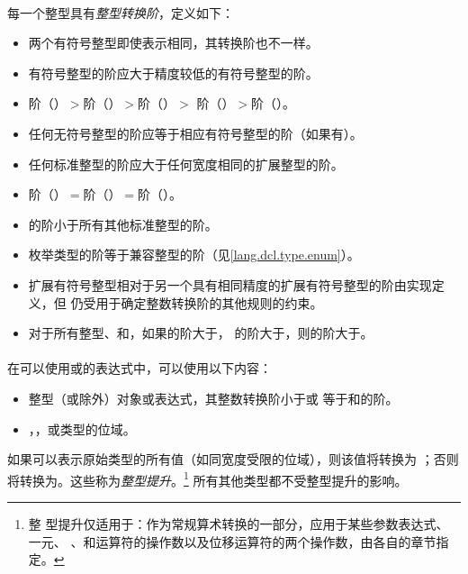 \paragraph{}
每一个整型具有\textit{整型转换阶}，定义如下：
\begin{itemize}
  \item{两个有符号整型即使表示相同，其转换阶也不一样。}
  \item{有符号整型的阶应大于精度较低的有符号整型的阶。}
  \item{阶（）$>$阶（）$>$阶（）$>$
    阶（）$>$阶（）。}
  \item{任何无符号整型的阶应等于相应有符号整型的阶（如果有）。}
  \item{任何标准整型的阶应大于任何宽度相同的扩展整型的阶。}
  \item{阶（）$=$阶（）$=$阶（）。}
  \item{的阶小于所有其他标准整型的阶。}
  \item{枚举类型的阶等于兼容整型的阶（见\ref{lang.dcl.type.enum}）。}
  \item{扩展有符号整型相对于另一个具有相同精度的扩展有符号整型的阶由实现定义，但
    仍受用于确定整数转换阶的其他规则的约束。}
  \item{对于所有整型、和，如果的阶大于，
    的阶大于，则的阶大于。}
\end{itemize}

\paragraph{}
在可以使用或的表达式中，可以使用以下内容：
\begin{itemize}
  \item{整型（或除外）对象或表达式，其整数转换阶小于或
    等于和的阶。}
  \item{，，或类型的位域。}
\end{itemize}
如果可以表示原始类型的所有值（如同宽度受限的位域），则该值将转换为
；否则将转换为。这些称为\textit{整型提升}。\footnote{整
型提升仅适用于：作为常规算术转换的一部分，应用于某些参数表达式、一元\tm{+}、
\tm{-}、和\tm{\~}运算符的操作数以及位移运算符的两个操作数，由各自的章节指定。}
所有其他类型都不受整型提升的影响。

